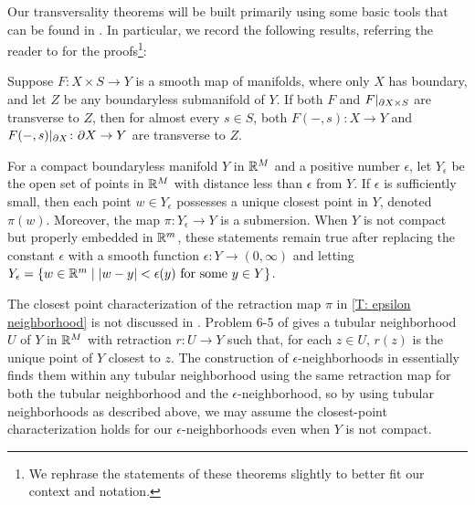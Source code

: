 Our transversality theorems will be built primarily using some basic tools that can be found in \cite[Section 2.3]{GuPo74}.
In particular, we record the following results, referring the reader to \cite[Section 2.3]{GuPo74} for the proofs\footnote{We rephrase the statements of these theorems slightly to better fit our context and notation.}:

\begin{theorem}\label{T: GP transversality}
	Suppose $F \colon X \times S \to Y$ is a smooth map of manifolds, where only $X$ has boundary, and let $Z$ be any boundaryless submanifold of $Y$.
	If both $F$ and $F|_{\partial X \times S}$ are transverse to $Z$, then for almost every $s \in S$, both $F(-,s) \colon X \to Y$ and $F(-,s)|_{\partial X} \colon \partial X \to Y$ are transverse to $Z$.
\end{theorem}

\begin{theorem}\label{T: epsilon neighborhood}
	For a compact boundaryless manifold $Y$ in $\mathbb{R}^M$ and a positive number $\epsilon$, let $Y_\epsilon$ be the open set of points in $\mathbb{R}^M$ with distance less than $\epsilon$ from $Y$.
	If $\epsilon$ is sufficiently small, then each point $w \in Y_\epsilon$ possesses a unique closest point in $Y$, denoted $\pi(w)$.
	Moreover, the map $\pi \colon Y_\epsilon \to Y$ is a submersion.
	When $Y$ is not compact but properly embedded in $\mathbb{R}^m$, these statements remain true after replacing the constant $\epsilon$ with a smooth function $\epsilon \colon Y \to (0, \infty)$ and letting $Y_\epsilon = \{w \in \mathbb{R}^m \mid |w-y|<\epsilon(y) \text{\ for some\ } y \in Y\}$.
\end{theorem}

\begin{remark}\label{R: epsilon neighborhood}
	The closest point characterization of the retraction map $\pi$ in \cref{T: epsilon neighborhood} is not discussed in \cite{GuPo74}.
	Problem 6-5 of \cite{Lee13} gives a tubular neighborhood $U$ of $Y$ in $\mathbb{R}^M$ with retraction $r \colon U \to Y$ such that, for each $z \in U$, $r(z)$ is the unique point of $Y$ closest to $z$.
	The construction of $\epsilon$-neighborhoods in \cite{GuPo74} essentially finds them within any tubular neighborhood using the same retraction map for both the tubular neighborhood and the $\epsilon$-neighborhood, so by using tubular neighborhoods as described above, we may assume the closest-point characterization holds for our $\epsilon$-neighborhoods even when $Y$ is not compact.
\end{remark}

